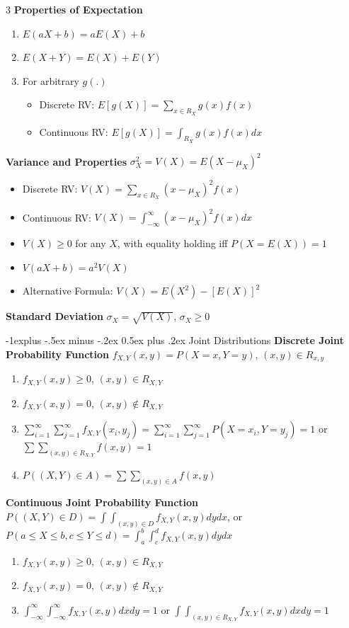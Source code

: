 \documentclass[10pt, landscape]{article}
\makeatletter
\renewcommand{\section}{\@startsection{section}{1}{0mm}%
                                {-1ex plus -.5ex minus -.2ex}%
                                {0.5ex plus .2ex}%
                                {\normalfont\large\bfseries}}
\renewcommand{\section}{\@startsection{section}{2}{0mm}%
                                {-1explus -.5ex minus -.2ex}%
                                {0.5ex plus .2ex}%
                                {\normalfont\normalsize\bfseries}}
\makeatother
\begin{document}
\begin{multicols*}{3}
\textbf{Properties of Expectation}
\begin{enumerate}
    \item $E(aX+b)=aE(X)+b$
    \item $E(X+Y)=E(X)+E(Y)$
    \item For arbitrary $g(.)$
    \begin{itemize}
        \item Discrete RV: $E[g(X)]=\sum_{x\in R_X}g(x)f(x)$
        \item Continuous RV: $E[g(X)]=\int_{R_X}g(x)f(x)dx$
    \end{itemize}
\end{enumerate}

\textbf{Variance and Properties} $\sigma_X^2=V(X)=E(X-\mu_X)^2$
\begin{itemize}
    \item Discrete RV: $V(X)=\sum_{x\in R_X}(x-\mu_X)^2f(x)$
    \item Continuous RV: $V(X)=\int_{-\infty}^\infty (x-\mu_X)^2f(x)dx$
    \item $V(X)\geq 0$ for any $X$, with equality holding iff $P(X=E(X))=1$
    \item $V(aX+b)=a^2V(X)$
    \item Alternative Formula: $V(X)=E(X^2)-[E(X)]^2$
\end{itemize}

\textbf{Standard Deviation} $\sigma_X=\sqrt{V(X)}$, $\sigma_X \geq 0$

\section{Joint Distributions}
\textbf{Discrete Joint Probability Function} $f_{X,Y}(x, y)=P(X=x, Y=y)$, $(x,y)\in R_{x, y}$
\begin{enumerate}
    \item $f_{X,Y}(x,y)\geq0$, $(x, y) \in R_{X,Y}$
    \item $f_{X,Y}(x,y)=0$, $(x, y) \notin R_{X,Y}$
    \item $\sum_{i=1}^\infty \sum_{j=1}^\infty f_{X,Y}(x_i,y_j)=\sum_{i=1}^\infty \sum_{j=1}^\infty P(X=x_i, Y=y_j)=1$ or $\sum\sum_{(x,y)\in R_{X,Y}}f(x,y)=1$
    \item $P((X, Y) \in A)=\sum\sum_{(x,y)\in A}f(x,y)$
\end{enumerate}

\textbf{Continuous Joint Probability Function} $P((X, Y)\in D)=\int\int_{(x, y) \in D}f_{X, Y}(x, y)dy dx$, or $P(a \leq X \leq b, c \leq Y \leq d)=\int_a^b\int_c^df_{X, Y}(x, y)dy dx$
\begin{enumerate}
    \item $f_{X, Y}(x, y) \geq 0$, $(x, y) \in R_{X, Y}$
    \item $f_{X, Y}(x, y) = 0$, $(x, y) \notin R_{X, Y}$
    \item $\int_{-\infty}^\infty\int_{-\infty}^\infty f_{X, Y}(x, y) dx dy = 1$ or $\int\int_{(x, y) \in R_{X, Y}}f_{X, Y}(x, y)dx dy=1$
\end{enumerate}


\end{multicols*}
\end{document}
